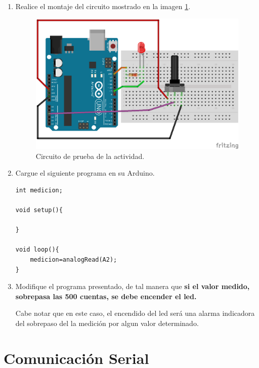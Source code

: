 \documentclass[letterpaper, 10pt]{report}
\begin{document}
\begin{enumerate}
	\item Realice el montaje del circuito mostrado en la imagen \ref{circuitoAnalogico}.
	
	\begin{figure}
	\centering
	\includegraphics[scale=0.7]{circuitoAnalogico.png}
	\caption{Circuito de prueba de la actividad.\label{circuitoAnalogico}}
	\end{figure}
	
	\item Cargue el siguiente programa en su Arduino.
	
\begin{lstlisting}[style=myArduino]
int medicion;

void setup(){

}

void loop(){
	medicion=analogRead(A2);
}
\end{lstlisting}
	\item Modifique el programa presentado, de tal manera que \textbf{si el valor medido, sobrepasa las 500 cuentas, se debe encender el led.}
	
	Cabe notar que en este caso, el encendido del led será una alarma indicadora del sobrepaso del la medición por algun valor determinado.
\end{enumerate}

\section{Comunicación Serial}
\end{document}
